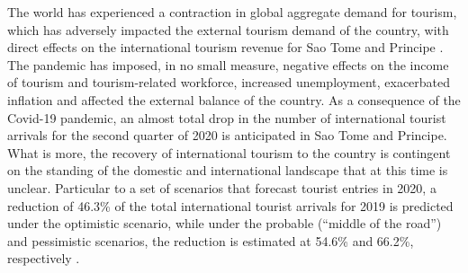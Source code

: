 \documentclass[
]{book}
\begin{document}
The world has experienced a contraction in global aggregate demand for tourism, which has adversely impacted the external tourism demand of the country, with direct effects on the international tourism revenue for Sao Tome and Principe . The pandemic has imposed, in no small measure, negative effects on the income of tourism and tourism-related workforce, increased unemployment, exacerbated inflation and affected the external balance of the country. As a consequence of the Covid-19 pandemic, an almost total drop in the number of international tourist arrivals for the second quarter of 2020 is anticipated in Sao Tome and Principe. What is more, the recovery of international tourism to the country is contingent on the standing of the domestic and international landscape that at this time is unclear. Particular to a set of scenarios that forecast tourist entries in 2020, a reduction of 46.3\% of the total international tourist arrivals for 2019 is predicted under the optimistic scenario, while under the probable (``middle of the road'') and pessimistic scenarios, the reduction is estimated at 54.6\% and 66.2\%, respectively .

\providecommand{\docline}[3]{\noalign{\global\setlength{\arrayrulewidth}{#1}}\arrayrulecolor[HTML]{#2}\cline{#3}}

\setlength{\tabcolsep}{2pt}

\renewcommand*{\arraystretch}{1.5}
\end{document}
